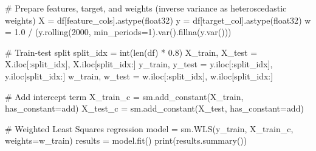 \documentclass[
  letterpaper,
  DIV=11,
  numbers=noendperiod]{scrartcl}
\newenvironment{Shaded}{\begin{snugshade}}{\end{snugshade}}
\newcommand{\BuiltInTok}[1]{\textcolor[rgb]{0.00,0.23,0.31}{#1}}
\newcommand{\CommentTok}[1]{\textcolor[rgb]{0.37,0.37,0.37}{#1}}
\newcommand{\DecValTok}[1]{\textcolor[rgb]{0.68,0.00,0.00}{#1}}
\newcommand{\FloatTok}[1]{\textcolor[rgb]{0.68,0.00,0.00}{#1}}
\newcommand{\NormalTok}[1]{\textcolor[rgb]{0.00,0.23,0.31}{#1}}
\newcommand{\OperatorTok}[1]{\textcolor[rgb]{0.37,0.37,0.37}{#1}}
\newcommand{\StringTok}[1]{\textcolor[rgb]{0.13,0.47,0.30}{#1}}
\begin{document}
\begin{Shaded}
\begin{Highlighting}[]
\CommentTok{\# Prepare features, target, and weights (inverse variance as heteroscedastic weights)}
\NormalTok{X }\OperatorTok{=}\NormalTok{ df[feature\_cols].astype(}\StringTok{\textquotesingle{}float32\textquotesingle{}}\NormalTok{)}
\NormalTok{y }\OperatorTok{=}\NormalTok{ df[target\_col].astype(}\StringTok{\textquotesingle{}float32\textquotesingle{}}\NormalTok{)}
\NormalTok{w }\OperatorTok{=} \FloatTok{1.0} \OperatorTok{/}\NormalTok{ (y.rolling(}\DecValTok{2000}\NormalTok{, min\_periods}\OperatorTok{=}\DecValTok{1}\NormalTok{).var().fillna(y.var()))}
\end{Highlighting}
\end{Shaded}

\begin{Shaded}
\begin{Highlighting}[]
\CommentTok{\# Train{-}test split}
\NormalTok{split\_idx }\OperatorTok{=} \BuiltInTok{int}\NormalTok{(}\BuiltInTok{len}\NormalTok{(df) }\OperatorTok{*} \FloatTok{0.8}\NormalTok{)        }
\NormalTok{X\_train, X\_test }\OperatorTok{=}\NormalTok{ X.iloc[:split\_idx],  X.iloc[split\_idx:]}
\NormalTok{y\_train, y\_test }\OperatorTok{=}\NormalTok{ y.iloc[:split\_idx],  y.iloc[split\_idx:]}
\NormalTok{w\_train, w\_test }\OperatorTok{=}\NormalTok{ w.iloc[:split\_idx],  w.iloc[split\_idx:]}
\end{Highlighting}
\end{Shaded}

\begin{Shaded}
\begin{Highlighting}[]
\CommentTok{\# Add intercept term}
\NormalTok{X\_train\_c }\OperatorTok{=}\NormalTok{ sm.add\_constant(X\_train, has\_constant}\OperatorTok{=}\StringTok{\textquotesingle{}add\textquotesingle{}}\NormalTok{)}
\NormalTok{X\_test\_c  }\OperatorTok{=}\NormalTok{ sm.add\_constant(X\_test,  has\_constant}\OperatorTok{=}\StringTok{\textquotesingle{}add\textquotesingle{}}\NormalTok{)}

\CommentTok{\# Weighted Least Squares regression}
\NormalTok{model     }\OperatorTok{=}\NormalTok{ sm.WLS(y\_train, X\_train\_c, weights}\OperatorTok{=}\NormalTok{w\_train)}
\NormalTok{results   }\OperatorTok{=}\NormalTok{ model.fit()}
\BuiltInTok{print}\NormalTok{(results.summary())}
\end{Highlighting}
\end{Shaded}
\end{document}
